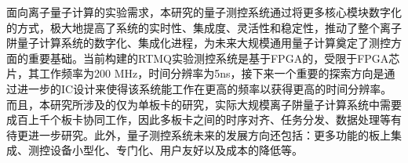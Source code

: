 \begin{conclusion}
面向离子量子计算的实验需求，本研究的量子测控系统通过将更多核心模块数字化的方式，极大地提高了系统的实时性、集成度、灵活性和稳定性，推动了整个离子阱量子计算系统的数字化、集成化进程，为未来大规模通用量子计算奠定了测控方面的重要基础。当前构建的RTMQ实验测控系统是基于FPGA的，受限于FPGA芯片，其工作频率为200 MHz，时间分辨率为5ns，接下来一个重要的探索方向是通过进一步的IC设计来使得该系统能工作在更高的频率以获得更高的时间分辨率。而且，本研究所涉及的仅为单板卡的研究，实际大规模离子阱量子计算系统中需要成百上千个板卡协同工作，因此多板卡之间的时序对齐、任务分发、数据处理等有待更进一步研究。此外，量子测控系统未来的发展方向还包括：更多功能的板上集成、测控设备小型化、专门化、用户友好以及成本的降低等。


\end{conclusion}


